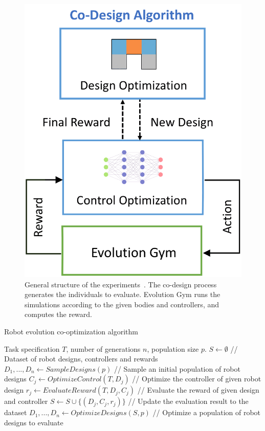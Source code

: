 \begin{figure}[h]
    \centering
    \includegraphics[scale=0.35]{images/experiment_design.pdf}
    \caption{General structure of the experiments~\cite{bhatia2021evolution}. The co-design process generates the individuals to evaluate. Evolution Gym runs the simulations according to the given bodies and controllers, and computes the reward.}
    \label{fig:optimization}
\end{figure}

\begin{algorithm}[h]
    \caption{Robot evolution co-optimization algorithm \cite{bhatia2021evolution}} \label{alg:co_optimization}
    \begin{algorithmic}
    \Require Task specification $T$, number of generations $n$, population size $p$.
        \State $S \gets \emptyset$ \hfill // Dataset of robot designs, controllers and rewards
        \State $D_1, ..., D_n \gets SampleDesigns(p)$ \hfill // Sample an initial population of robot designs
            \State $C_j \gets OptimizeControl(T, D_j)$ \hfill // Optimize the controller of given robot design
            \State $r_j \gets EvaluateReward(T, D_j, C_j)$ \hfill // Evaluate the reward of given design and controller
            \State $S \gets S \cup \{(D_j, C_j, r_j)\}$ \hfill // Update the evaluation result to the dataset
            \EndFor
        \State $D_1, ..., D_n \gets OptimizeDesigns(S, p)$ \hfill // Optimize a population of robot designs to evaluate
        \EndFor
    \end{algorithmic}
\end{algorithm}


